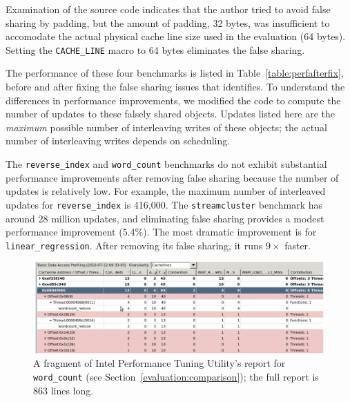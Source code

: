 
Examination of the source code indicates that the author tried to avoid false sharing 
by padding, but the amount of padding, 32 bytes, was insufficient
to accomodate the actual physical cache line size 
used in the evaluation (64 bytes).  Setting
the \texttt{CACHE\_LINE} macro to 64 bytes eliminates the
false sharing.

The performance of these four benchmarks is listed in
Table~\ref{table:perfafterfix}, before and after fixing the false
sharing issues that \sheriffdetect{} identifies.  To understand 
the differences in performance improvements, we modified the code
to compute the number of updates to these falsely shared objects.
Updates listed here are the \emph{maximum} possible number of interleaving
writes of these objects; the actual number of interleaving writes
depends on scheduling.

The \texttt{reverse\_index} and \texttt{word\_count} benchmarks do not
exhibit substantial performance improvements after removing false
sharing because the number of updates is relatively low. For example,
the maximum number of interleaved updates for \texttt{reverse\_index}
is 416,000. The \texttt{streamcluster} benchmark has around 28 million
updates, and eliminating false sharing provides a modest performance
improvement (5.4\%). The most dramatic improvement is
for \texttt{linear\_regression}. After removing its false sharing, it
runs $9\times$ faster.


\begin{figure}[!t]
\centering
\includegraphics[width=6in]{figure/wordcount}
\caption{A fragment of Intel Performance Tuning Utility's report for \texttt{word\_count} (see Section~\ref{evaluation:comparison}); the full report is 863 lines long.
\label{fig:wordcount}}
\end{figure}

